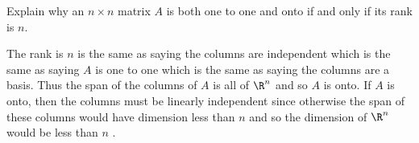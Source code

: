 \begin{enumialphparenastyle}
\begin{ex} Explain why an $n\times n$ matrix $A$ is both one to one and onto if
and only if its rank is $n$. \vspace{1mm}
\begin{sol}
The rank is $n$ is the same as saying the
columns are independent which is the same as saying $A$ is one to one which
is the same as saying the columns are a basis. Thus the span of the columns
of $A$ is all of $\R^{n}$ and so $A$ is onto. If $A$ is onto, then
the columns must be linearly independent since otherwise the span of these
columns would have dimension less than $n$ and so the dimension of $\R^{n}$ would be less than $n$ .
\end{sol}
\end{ex}

\end{enumialphparenastyle}
